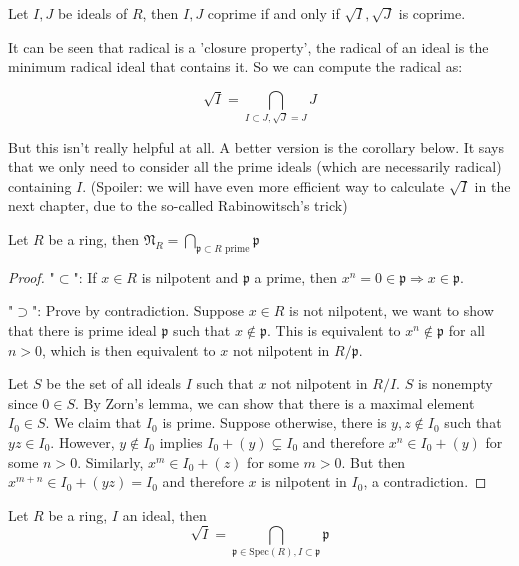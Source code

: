 \documentclass{note-eng}
\begin{document}
\begin{corollary}
    Let $I, J$ be ideals of $R$, then $I, J$ coprime if and only if $\sqrt{I}, \sqrt{J}$ is coprime.
\end{corollary}

It can be seen that radical is a 'closure property', the radical of an ideal is the minimum radical ideal that contains it. So we can compute the radical as:

$$\sqrt{I} = \bigcap\limits_{I \subset J, \sqrt{J} = J} J$$

But this isn't really helpful at all. A better version is the corollary below. It says that we only need to consider all the prime ideals (which are necessarily radical) containing $I$. (Spoiler: we will have even more efficient way to calculate $\sqrt{I}$ in the next chapter, due to the so-called Rabinowitsch's trick)

\begin{proposition}
    Let $R$ be a ring, then $\mathfrak{N}_R = \bigcap\limits_{\mathfrak{p} \subset R \text{ prime}} \mathfrak{p}$
\end{proposition}

\begin{proof}
    "$\subset$": If $x \in R$ is nilpotent and $\mathfrak{p}$ a prime, then $x^n = 0 \in \mathfrak{p} \Rightarrow x \in \mathfrak{p}$.

    "$\supset$": Prove by contradiction. Suppose $x \in R$ is not nilpotent, we want to show that there is prime ideal $\mathfrak{p}$ such that $x \notin \mathfrak{p}$. This is equivalent to $x^n \notin \mathfrak{p}$ for all $n \gt 0$, which is then equivalent to $x$ not nilpotent in $R / \mathfrak{p}$.
    
    Let $S$ be the set of all ideals $I$ such that $x$ not nilpotent in $R / I$. $S$ is nonempty since $0 \in S$. By Zorn's lemma, we can show that there is a maximal element $I_0 \in S$. We claim that $I_0$ is prime. Suppose otherwise, there is $y, z \notin I_0$ such that $yz \in I_0$. However, $y \notin I_0$ implies $I_0 + (y) \subsetneq I_0$ and therefore $x^n \in I_0 + (y)$ for some $n \gt 0$. Similarly, $x^m \in I_0 + (z)$ for some $m \gt 0$. But then $x^{m + n} \in I_0 + (yz) = I_0$ and therefore $x$ is nilpotent in $I_0$, a contradiction.
\end{proof}

\begin{corollary}
    Let $R$ be a ring, $I$ an ideal, then
    $$\sqrt{I} = \bigcap\limits_{\mathfrak{p} \in \mathrm{Spec}(R), I \subset \mathfrak{p}} \mathfrak{p}$$
\end{corollary}
\end{document}
